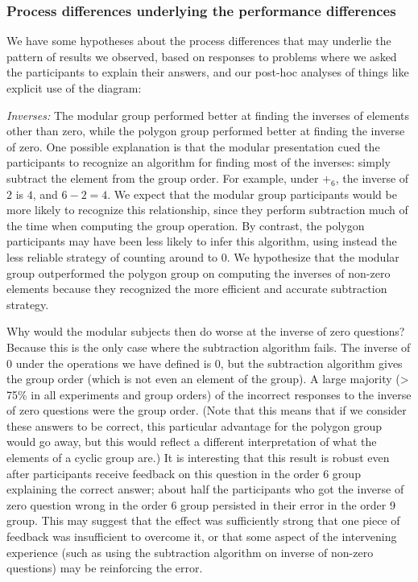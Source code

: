 \documentclass[man,10pt]{apa6}
\begin{document}
\subsubsection{Process differences underlying the performance differences}
We have some hypotheses about the process differences that may underlie the pattern of results we observed, based on responses to problems where we asked the participants to explain their answers, and our post-hoc analyses of things like explicit use of the diagram:\par 
\textit{Inverses:} The modular group performed better at finding the inverses of elements other than zero, while the polygon group performed better at finding the inverse of zero. One possible explanation is that the modular presentation cued the participants to recognize an algorithm for finding most of the inverses: simply subtract the element from the group order. For example, under $+_6$, the inverse of $2$ is $4$, and $6-2 = 4$. We expect that the modular group participants would be more likely to recognize this relationship, since they perform subtraction much of the time when computing the group operation. By contrast, the polygon participants may have been less likely to infer this algorithm, using instead the less reliable strategy of counting around to 0. We hypothesize that the modular group outperformed the polygon group on computing the inverses of non-zero elements because they recognized the more efficient and accurate subtraction strategy. \par 
Why would the modular subjects then do worse at the inverse of zero questions? Because this is the only case where the subtraction algorithm fails. The inverse of 0 under the operations we have defined is 0, but the subtraction algorithm gives the group order (which is not even an element of the group). A large majority (> 75\% in all experiments and group orders) of the incorrect responses to the inverse of zero questions were the group order. (Note that this means that if we consider these answers to be correct, this particular advantage for the polygon group would go away, but this would reflect a different interpretation of what the elements of a cyclic group are.) It is interesting that this result is robust even after participants receive feedback on this question in the order 6 group explaining the correct answer; about half the participants who got the inverse of zero question wrong in the order 6 group persisted in their error in the order 9 group. This may suggest that the effect was sufficiently strong that one piece of feedback was insufficient to overcome it, or that some aspect of the intervening experience (such as using the subtraction algorithm on inverse of non-zero questions) may be reinforcing the error. \par
\end{document}

